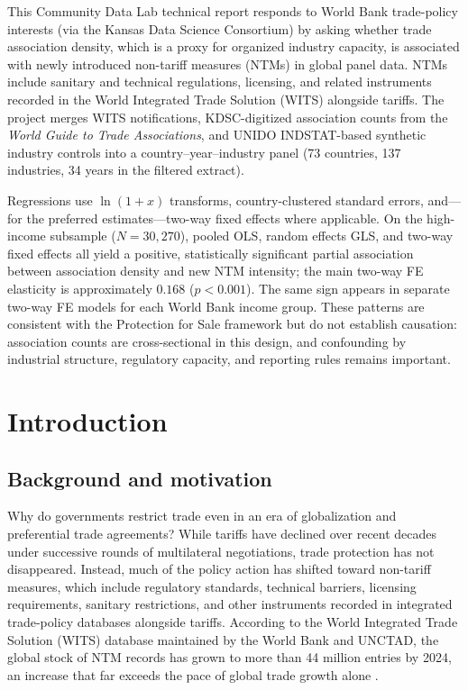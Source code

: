 \documentclass[12pt,letterpaper]{article}
\begin{document}
This Community Data Lab technical report responds to World Bank trade-policy interests (via the Kansas Data Science Consortium) by asking whether trade association density, which is a proxy for organized industry capacity, is associated with newly introduced non-tariff measures (NTMs) in global panel data. NTMs include sanitary and technical regulations, licensing, and related instruments recorded in the World Integrated Trade Solution (WITS) alongside tariffs. The project merges WITS notifications, KDSC-digitized association counts from the \textit{World Guide to Trade Associations}, and UNIDO INDSTAT-based synthetic industry controls into a country--year--industry panel (73 countries, 137 industries, 34 years in the filtered extract).

Regressions use $\ln(1+x)$ transforms, country-clustered standard errors, and---for the preferred estimates---two-way fixed effects where applicable. On the high-income subsample ($N=30{,}270$), pooled OLS, random effects GLS, and two-way fixed effects all yield a positive, statistically significant partial association between association density and new NTM intensity; the main two-way FE elasticity is approximately $0.168$ ($p<0.001$). The same sign appears in separate two-way FE models for each World Bank income group. These patterns are consistent with the Protection for Sale framework \citep{grossmanHelpman1994} but do not establish causation: association counts are cross-sectional in this design, and confounding by industrial structure, regulatory capacity, and reporting rules remains important.

\section{Introduction}

\subsection{Background and motivation}

Why do governments restrict trade even in an era of globalization and preferential trade agreements? While tariffs have declined over recent decades under successive rounds of multilateral negotiations, trade protection has not disappeared. Instead, much of the policy action has shifted toward non-tariff measures, which include regulatory standards, technical barriers, licensing requirements, sanitary restrictions, and other instruments recorded in integrated trade-policy databases alongside tariffs. According to the World Integrated Trade Solution (WITS) database maintained by the World Bank and UNCTAD, the global stock of NTM records has grown to more than 44 million entries by 2024, an increase that far exceeds the pace of global trade growth alone \citep{wits2024}.
\end{document}
